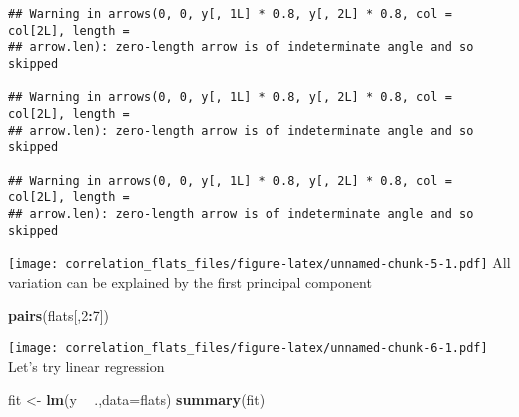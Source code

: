 \documentclass[
]{article}
\newenvironment{Shaded}{\begin{snugshade}}{\end{snugshade}}
\newcommand{\DataTypeTok}[1]{\textcolor[rgb]{0.13,0.29,0.53}{#1}}
\newcommand{\DecValTok}[1]{\textcolor[rgb]{0.00,0.00,0.81}{#1}}
\newcommand{\KeywordTok}[1]{\textcolor[rgb]{0.13,0.29,0.53}{\textbf{#1}}}
\newcommand{\NormalTok}[1]{#1}
\newcommand{\OperatorTok}[1]{\textcolor[rgb]{0.81,0.36,0.00}{\textbf{#1}}}
\newcommand{\StringTok}[1]{\textcolor[rgb]{0.31,0.60,0.02}{#1}}
\begin{document}
\begin{verbatim}
## Warning in arrows(0, 0, y[, 1L] * 0.8, y[, 2L] * 0.8, col = col[2L], length =
## arrow.len): zero-length arrow is of indeterminate angle and so skipped

## Warning in arrows(0, 0, y[, 1L] * 0.8, y[, 2L] * 0.8, col = col[2L], length =
## arrow.len): zero-length arrow is of indeterminate angle and so skipped

## Warning in arrows(0, 0, y[, 1L] * 0.8, y[, 2L] * 0.8, col = col[2L], length =
## arrow.len): zero-length arrow is of indeterminate angle and so skipped
\end{verbatim}

\texttt{[image: correlation\_flats\_files/figure-latex/unnamed-chunk-5-1.pdf]}
All variation can be explained by the first principal component

\begin{Shaded}
\begin{Highlighting}[]
\KeywordTok{pairs}\NormalTok{(flats[,}\DecValTok{2}\OperatorTok{:}\DecValTok{7}\NormalTok{])}
\end{Highlighting}
\end{Shaded}

\texttt{[image: correlation\_flats\_files/figure-latex/unnamed-chunk-6-1.pdf]}
Let's try linear regression

\begin{Shaded}
\begin{Highlighting}[]
\NormalTok{fit <-}\StringTok{ }\KeywordTok{lm}\NormalTok{(y }\OperatorTok{~}\StringTok{ }\NormalTok{.,}\DataTypeTok{data=}\NormalTok{flats) }
\KeywordTok{summary}\NormalTok{(fit)}
\end{Highlighting}
\end{Shaded}
\end{document}
